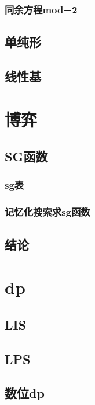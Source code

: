 ﻿\documentclass[a4paper,twocolumn]{article}
\begin{document}
\subsubsection{同余方程mod=2}

\subsection{单纯形}

\subsection{线性基}

\section{博弈}
\subsection{SG函数}
\begin{spacing}{1.5}

\end{spacing}
\subsubsection{sg表}

\subsubsection{记忆化搜索求sg函数}

\subsection{结论}
\begin{spacing}{1.5}

\end{spacing}
\section{dp}
\subsection{LIS}

\subsection{LPS}

\subsection{数位dp}

\end{document}
